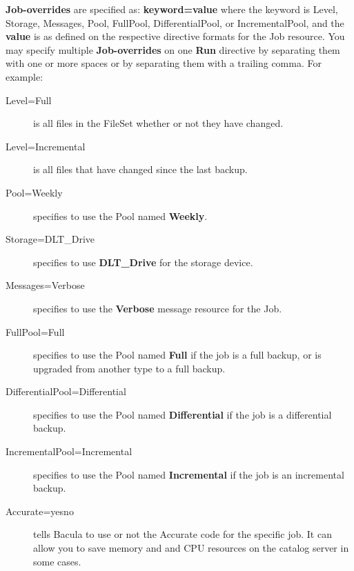 \begin{description}
   {\bf Job-overrides} are specified as: {\bf keyword=value} where the
   keyword is Level, Storage, Messages, Pool, FullPool, DifferentialPool,
   or IncrementalPool, and the {\bf value} is as defined on the respective
   directive formats for the Job resource.  You may specify multiple {\bf
   Job-overrides} on one {\bf Run} directive by separating them with one or
   more spaces or by separating them with a trailing comma.  For example:

\begin{description}

\item [Level=Full]
   is all files in the FileSet whether or not  they have changed.  

\item [Level=Incremental]
   is all files that have changed since  the last backup.  

\item [Pool=Weekly]
   specifies to use the Pool named {\bf Weekly}.  

\item [Storage=DLT\_Drive]
   specifies to use {\bf DLT\_Drive} for  the storage device.  

\item [Messages=Verbose]
   specifies to use the {\bf Verbose}  message resource for the Job.  

\item [FullPool=Full]
   specifies to use the Pool named {\bf Full}  if the job is a full backup, or
is
upgraded from another type  to a full backup.  

\item [DifferentialPool=Differential]
   specifies to use the Pool named {\bf Differential} if the job is a
   differential  backup.  

\item [IncrementalPool=Incremental]
   specifies to use the Pool  named {\bf Incremental} if the job is an
incremental  backup.  


\item [Accurate=yes\vb{}no]
   tells Bacula to use or not the Accurate code for the specific job. It can
   allow you to save memory and and CPU resources on the catalog server in some
   cases.


\end{description}
\end{description}
